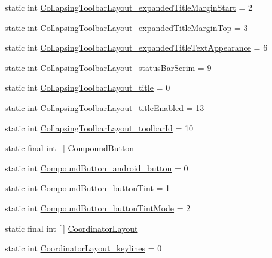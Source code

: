 \begin{DoxyCompactItemize}
\item 
static int \hyperlink{classandroid_1_1support_1_1v4_1_1R_1_1styleable_a5f942ec17cd01a93f6b3ce569421954b}{Collapsing\+Toolbar\+Layout\+\_\+expanded\+Title\+Margin\+Start} = 2
\item 
static int \hyperlink{classandroid_1_1support_1_1v4_1_1R_1_1styleable_a9e49bb8ccfb4c8294690cba1fce71f73}{Collapsing\+Toolbar\+Layout\+\_\+expanded\+Title\+Margin\+Top} = 3
\item 
static int \hyperlink{classandroid_1_1support_1_1v4_1_1R_1_1styleable_ad9258f77de37879142ccb6e7d0c1c841}{Collapsing\+Toolbar\+Layout\+\_\+expanded\+Title\+Text\+Appearance} = 6
\item 
static int \hyperlink{classandroid_1_1support_1_1v4_1_1R_1_1styleable_a0d19b1379e73d24050b61fe835c56593}{Collapsing\+Toolbar\+Layout\+\_\+status\+Bar\+Scrim} = 9
\item 
static int \hyperlink{classandroid_1_1support_1_1v4_1_1R_1_1styleable_aa433ebbb56ee0a51b7f7e167863bdd12}{Collapsing\+Toolbar\+Layout\+\_\+title} = 0
\item 
static int \hyperlink{classandroid_1_1support_1_1v4_1_1R_1_1styleable_ac4319599b3c76f2446ebe9536abeba56}{Collapsing\+Toolbar\+Layout\+\_\+title\+Enabled} = 13
\item 
static int \hyperlink{classandroid_1_1support_1_1v4_1_1R_1_1styleable_ab80f4b8280bdc2b619f7f20012eb6f41}{Collapsing\+Toolbar\+Layout\+\_\+toolbar\+Id} = 10
\item 
static final int \mbox{[}$\,$\mbox{]} \hyperlink{classandroid_1_1support_1_1v4_1_1R_1_1styleable_ab9cf77e48999c324e11a9b63f5429cfd}{Compound\+Button}
\item 
static int \hyperlink{classandroid_1_1support_1_1v4_1_1R_1_1styleable_ae8a9c7000d158886777cc07f4f6e7958}{Compound\+Button\+\_\+android\+\_\+button} = 0
\item 
static int \hyperlink{classandroid_1_1support_1_1v4_1_1R_1_1styleable_aa3973f711ba64818b88ee75a71f6c911}{Compound\+Button\+\_\+button\+Tint} = 1
\item 
static int \hyperlink{classandroid_1_1support_1_1v4_1_1R_1_1styleable_a93b165b3f35bb81a7874aa1c16cdd3c9}{Compound\+Button\+\_\+button\+Tint\+Mode} = 2
\item 
static final int \mbox{[}$\,$\mbox{]} \hyperlink{classandroid_1_1support_1_1v4_1_1R_1_1styleable_a94a213ce8a987dc40a09f872e7b309c5}{Coordinator\+Layout}
\item 
static int \hyperlink{classandroid_1_1support_1_1v4_1_1R_1_1styleable_a45331911c9dab41ebfce37bf8248393e}{Coordinator\+Layout\+\_\+keylines} = 0

\end{DoxyCompactItemize}
